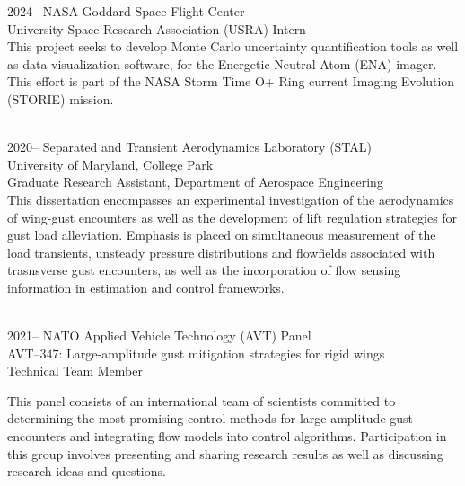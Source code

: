 \documentclass[12pt,letterpaper]{report}
\begin{document}
    \begin{tablist}

        \item[2024--]   \tab{}NASA Goddard Space Flight Center \\ 
        University Space Research Association (USRA) Intern \\
        
    \vspace{1.5mm}
        This project seeks to develop Monte Carlo uncertainty quantification tools as well as data visualization software, for the Energetic Neutral Atom (ENA) imager. This effort is part of the NASA Storm Time O+ Ring current
        Imaging Evolution (STORIE) mission. \\\

        \item[2020--]   \tab{}Separated and Transient Aerodynamics Laboratory (STAL) \\ 
        University of Maryland, College Park \\ 
        Graduate Research Assistant, Department of Aerospace Engineering  \\
        
  \vspace{1.5mm}
        This dissertation encompasses an experimental investigation of the aerodynamics of wing-gust encounters as well as the development of lift regulation strategies for gust load alleviation. 
        Emphasis is placed on simultaneous measurement of the load transients, unsteady pressure distributions and flowfields associated with trasnsverse gust encounters, as well as the incorporation 
        of flow sensing information in estimation and control frameworks. \\\
                        

		\item[2021--]   \tab{}NATO Applied Vehicle Technology (AVT) Panel \\ 
		AVT--$347$: Large-amplitude gust mitigation strategies for rigid wings \\
		Technical Team Member \\
		
		\vspace{1.5mm}
		
		This panel consists of an international team of scientists committed to determining the most promising control methods for large-amplitude gust encounters and integrating flow models into control algorithms. Participation in this group involves presenting and sharing research results as well as discussing research ideas and questions. \\\
		 



\end{tablist}
\end{document}
